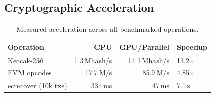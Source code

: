 \subsection{Cryptographic Acceleration}

\begin{table}[h]
\centering
\small
\begin{tabular}{lrrl}
\toprule
\textbf{Operation} & \textbf{CPU} & \textbf{GPU/Parallel} & \textbf{Speedup} \\
\midrule
Keccak-256           & 1.3\,Mhash/s & 17.1\,Mhash/s & 13.2$\times$ \\
EVM opcodes          & 17.7\,M/s    & 85.9\,M/s     & 4.85$\times$ \\
ecrecover (10k txs)  & 334\,ms      & 47\,ms         & 7.1$\times$ \\
\bottomrule
\end{tabular}
\caption{Measured acceleration across all benchmarked operations.}
\label{tab:accel}
\end{table}

